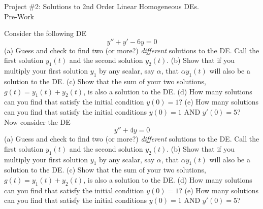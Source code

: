 \documentclass[epsf]{article}
\begin{document}
\newcommand{\R}{\mathbb{R}}
\newcommand{\noi}{\noindent}
\newcommand{\bs}{\bigskip}



\begin{center}
{\Large Project \#2: Solutions to 2nd Order Linear Homogeneous DEs.\\
\vskip 2mm
Pre-Work}
\end{center}


\noi{\bf PW 1}  Consider the following DE
$$ y'' + y' - 6y = 0$$
\noi (a) Guess and check to find two (or more?) \textit{different} solutions to the DE.  Call the first solution $y_1(t)$ and the second solution $y_2(t)$.
\vskip 2mm
\noi (b) Show that if you multiply your first solution $y_1$ by any scalar, say $\alpha$, that $\alpha y_1(t)$ will also be a solution to the DE.
\vskip 2mm
\noi (c) Show that the sum of your two solutions, $g(t) = y_1(t)+y_2(t)$, is also a solution to the DE.
\vskip 2mm
\noi (d) How many solutions can you find that satisfy the initial condition $y(0) =  1$?
\vskip 2mm
\noi (e) How many solutions can you find that satisfy the initial conditions $y(0) = 1$ AND $y'(0) = 5$?\\

\noi{\bf PW 2} Now consider the DE
$$ y'' + 4y = 0$$
\noi (a) Guess and check to find two (or more?) \textit{different} solutions to the DE.  Call the first solution $y_1(t)$ and the second solution $y_2(t)$.
\vskip 2mm
\noi (b) Show that if you multiply your first solution $y_1$ by any scalar, say $\alpha$, that $\alpha y_1(t)$ will also be a solution to the DE.
\vskip 2mm
\noi (c) Show that the sum of your two solutions, $g(t) = y_1(t)+y_2(t)$, is also a solution to the DE.
\vskip 2mm
\noi (d) How many solutions can you find that satisfy the initial condition $y(0) =  1$?
\vskip 2mm
\noi (e) How many solutions can you find that satisfy the initial conditions $y(0) = 1$ AND $y'(0) = 5$?\\
\end{document}
